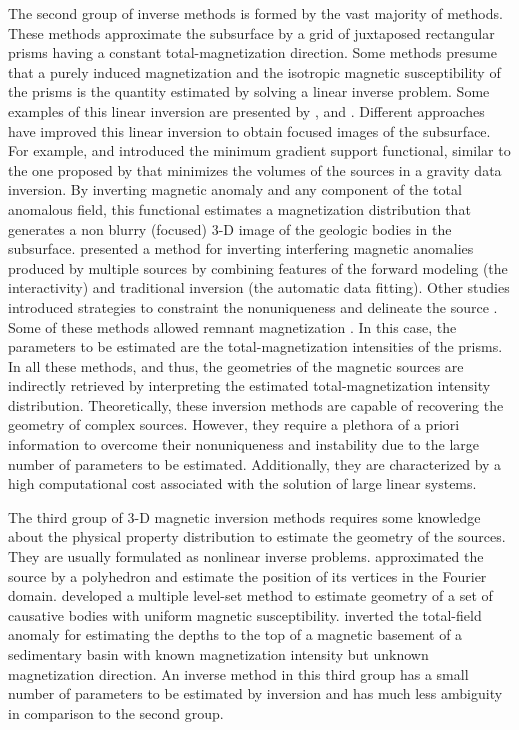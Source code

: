 The second group of inverse methods is formed by the vast majority of methods. 
These methods approximate the subsurface by a grid of juxtaposed rectangular prisms having 
a constant total-magnetization direction. Some methods presume that a purely induced 
magnetization and the isotropic magnetic susceptibility of the prisms is the quantity estimated by solving a linear inverse problem. 
Some examples of this linear inversion are presented by \cite{cribb-1976}, \cite{li_3-d_1996} and \cite{pilkington_3-d_1997}.
Different approaches have improved this linear inversion to obtain focused images of the subsurface. 
For example, \cite{portniaguine_focusing_1999} and \cite{portniaguine_3d_2002} introduced the minimum gradient support functional, similar to the one proposed by
\cite{last-1983} that minimizes the volumes of the sources in a gravity data inversion. 
By inverting magnetic anomaly and any component of the total anomalous field, this functional estimates a magnetization distribution that generates a non blurry (focused) 3-D image of the geologic bodies in the subsurface.
\cite{barbosa_interactive_2006} presented a method for inverting interfering magnetic anomalies produced by multiple sources by combining features of the forward modeling (the interactivity) and traditional inversion (the automatic data fitting). Other studies introduced strategies to constraint the nonuniqueness and delineate the source \cite[]{tontini,pilkington_3d_2009,shamsipour_3d_2011,cella_inversion_2012,abedi-2015}. 
Some of these methods allowed remnant magnetization \cite[e.g., ][]{pignatelli-2006}. 
In this case, the parameters to be estimated are the total-magnetization intensities 
of the prisms. 
In all these methods, and thus, the geometries of the magnetic sources are indirectly retrieved by interpreting the estimated total-magnetization intensity 
distribution. 
Theoretically, these inversion methods are capable of recovering the geometry of complex 
sources. However, they require a plethora of a priori information to overcome 
their nonuniqueness and instability due to the large number of parameters 
to be estimated. Additionally, they are characterized by a high 
computational cost associated with the solution of large linear systems.

The third group of 3-D magnetic inversion methods requires some knowledge about the 
physical property distribution to estimate the geometry of the sources. 
They are usually formulated as nonlinear inverse problems. 
\cite{wang_inversion_1990} approximated the source by a polyhedron and estimate 
the position of its vertices in the Fourier domain. 
\cite{wenbin-2017} developed a multiple level-set method to estimate geometry 
of a set of causative bodies with uniform magnetic susceptibility. 
\cite{hidalgo-2019} inverted the total-field anomaly for estimating the depths to the top of a magnetic basement of a sedimentary basin with known magnetization intensity but unknown magnetization direction. 
An inverse method in this third group has a small number of parameters to be estimated by inversion and has much less ambiguity in comparison to the second group. 

